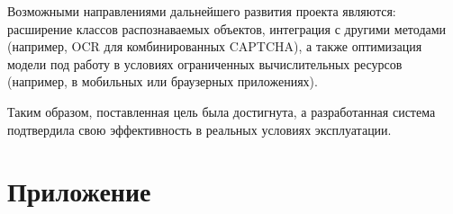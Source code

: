 \documentclass{altsu-report}
\begin{document}
Возможными направлениями дальнейшего развития проекта являются: расширение классов распознаваемых объектов, интеграция с другими методами (например, OCR для комбинированных CAPTCHA), а также оптимизация модели под работу в условиях ограниченных вычислительных ресурсов (например, в мобильных или браузерных приложениях).

Таким образом, поставленная цель была достигнута, а разработанная система подтвердила свою эффективность в реальных условиях эксплуатации.

\newpage
{}
\printbibliography[title={Список использованной литературы}]

\appendix
\newpage
\chapter*{\raggedleft\label{appendix1}Приложение}

\vspace{-0.5cm}
\begin{code}
\vspace{-0.2cm}
{\small
\inputminted[mathescape,linenos,frame=lines,breaklines]{Python}{code/get_captcha.py}
}
\end{code}

\begin{code}
\vspace{-0.5cm}
{\small
\inputminted[mathescape,linenos,frame=lines,breaklines]{Python}{code/recognize_objects.py}
}
\end{code}

\begin{code}
\vspace{-0.5cm}
{\small
\inputminted[mathescape,linenos,frame=lines,breaklines]{Python}{code/solve_captcha.py}
}
\end{code}
\end{document}
